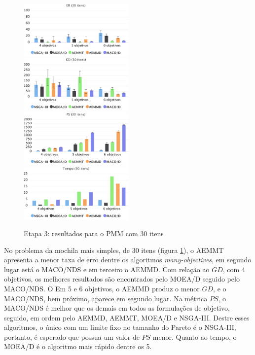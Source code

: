 \begin{figure}[!htbp]
	\caption{Etapa 3: resultados para o PMM com 30 itens}
	\label{fig_exp3_pmm_30}
	\includegraphics[width=0.5\textwidth]{cap_experimentos/figs/etapa3/er-mkp-30}
	\includegraphics[width=0.5\textwidth]{cap_experimentos/figs/etapa3/gd-mkp-30}
	\includegraphics[width=0.5\textwidth]{cap_experimentos/figs/etapa3/ps-mkp-30}
	\includegraphics[width=0.5\textwidth]{cap_experimentos/figs/etapa3/time-mkp-30}
\end{figure}

No problema da mochila mais simples, de 30 itens (figura \ref{fig_exp3_pmm_30}), o AEMMT apresenta a menor taxa de erro dentre os algoritmos \textit{many-objectives}, em segundo lugar está o MACO/NDS e em terceiro o AEMMD. Com relação ao $GD$, com 4 objetivos, os melhores resultados são encontrados pelo MOEA/D seguido pelo MACO/NDS. O Em 5 e 6 objetivos, o AEMMD produz o menor $GD$, e o MACO/NDS, bem próximo, aparece em segundo lugar. Na métrica $PS$, o MACO/NDS é melhor que os demais em todos as formulações de objetivo, seguido, em ordem pelo AEMMD, AEMMT, MOEA/D e NSGA-III. Destre esses algoritmos, o único com um limite fixo no tamanho do Pareto é o NSGA-III, portanto, é esperado que possua um valor de $PS$ menor. Quanto ao tempo, o MOEA/D é o algoritmo mais rápido dentre os 5.

